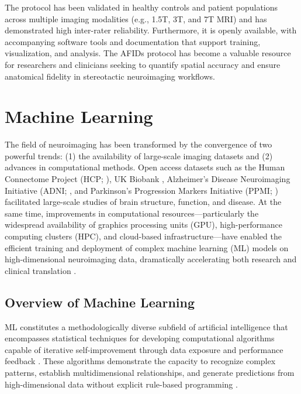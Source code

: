 The protocol has been validated in healthy controls and patient populations across multiple imaging modalities (e.g., 1.5T, 3T, and 7T MRI) and has demonstrated high inter-rater reliability. Furthermore, it is openly available, with accompanying software tools and documentation that support training, visualization, and analysis. The AFIDs protocol has become a valuable resource for researchers and clinicians seeking to quantify spatial accuracy and ensure anatomical fidelity in stereotactic neuroimaging workflows.

\section{Machine Learning}
The field of neuroimaging has been transformed by the convergence of two powerful trends: (1) the availability of large-scale imaging datasets and (2) advances in computational methods. Open access datasets such as the Human Connectome Project (HCP; \cite{Van_Essen2013-yi}), UK Biobank \cite{Sudlow2015-lq}, Alzheimer's Disease Neuroimaging Initiative (ADNI; \cite{Petersen2010-rd}, and Parkinson's Progression Markers Initiative (PPMI; \cite{Marek2018-wx}) facilitated large-scale studies of brain structure, function, and disease. At the same time, improvements in computational resources—particularly the widespread availability of graphics processing units (GPU), high-performance computing clusters (HPC), and cloud-based infrastructure—have enabled the efficient training and deployment of complex machine learning (ML) models on high-dimensional neuroimaging data, dramatically accelerating both research and clinical translation \cite{Bouchard2016-cd,Kirimtat2024-is}.

\subsection{Overview of Machine Learning}
ML constitutes a methodologically diverse subfield of artificial intelligence that encompasses statistical techniques for developing computational algorithms capable of iterative self-improvement through data exposure and performance feedback \cite{Sarker2021-ng}. These algorithms demonstrate the capacity to recognize complex patterns, establish multidimensional relationships, and generate predictions from high-dimensional data without explicit rule-based programming \cite{Davatzikos2019-zq}.


